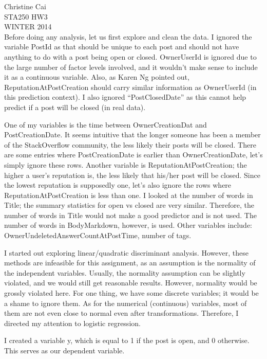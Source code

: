 \documentclass[12pt]{article}
\begin{document}
\noindent Christine Cai\\
STA250 HW3\\
WINTER 2014\\

Before doing any analysis, let us first explore and clean the data. I ignored the variable PostId as that should be unique to each post and should not have anything to do with a post being open or closed. OwnerUserId is ignored due to the large number of factor levels involved, and it wouldn't make sense to include it as a continuous variable. Also, as Karen Ng pointed out, ReputationAtPostCreation should carry similar information as OwnerUserId (in this prediction context). I also ignored ``PostClosedDate'' as this cannot help predict if a post will be closed (in real data).

One of my variables is the time between OwnerCreationDat and PostCreationDate. It seems intuitive that the longer someone has been a member of the StackOverflow community, the less likely their posts will be closed. There are some entries where PostCreationDate is earlier than OwnerCreationDate, let's simply ignore these rows. Another variable is ReputationAtPostCreation; the higher a user's reputation is, the less likely that his/her post will be closed. Since the lowest reputation is supposedly one, let's also ignore the rows where ReputationAtPostCreation is less than one. I looked at the number of words in Title; the summary statistics for open vs closed are very similar. Therefore, the number of words in Title would not make a good predictor and is not used. The number of words in BodyMarkdown, however, is used. Other variables include: OwnerUndeletedAnswerCountAtPostTime, number of tags.

I started out exploring linear/quadratic discriminant analysis. However, these methods are infeasible for this assignment, as an assumption is the normality of the independent variables. Usually, the normality assumption can be slightly violated, and we would still get reasonable results. However, normality would be grossly violated here. For one thing, we have some discrete variables; it would be a shame to ignore them. As for the numerical (continuous) variables, most of them are not even close to normal even after transformations. Therefore, I directed my attention to logistic regression.

I created a variable y, which is equal to 1 if the post is open, and 0 otherwise. This serves as our dependent variable.
\end{document}

